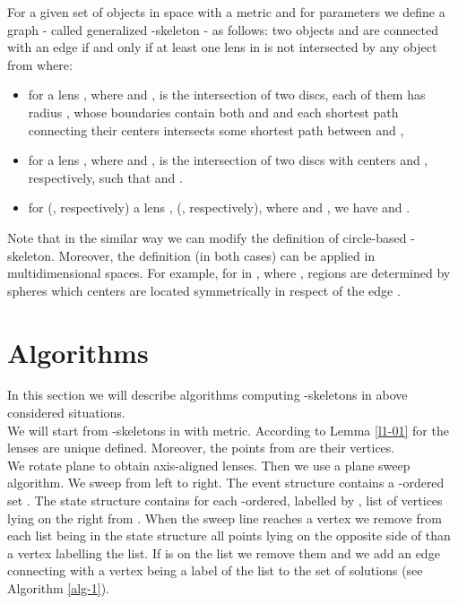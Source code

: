 \documentclass[11pt]{llncs}
\begin{document}
\begin{definition}
\label{betaskeletons5}
For a given set of objects  in space  with a metric  and for parameters 
 we define a graph  - called generalized -skeleton -
as follows: 
two objects  and  are connected with an edge if and only if  
at least one lens in  is not intersected by any object from 
 where:
\begin{itemize}
\item
for  a lens , where  
and , is the intersection of two discs, each of them has radius 
, whose boundaries contain both  and  and each shortest
path connecting their centers intersects some shortest path between  and , 

\item
for  a lens , where  
and , is the intersection of two discs with centers  and , respectively,
such that  and 
.

\item
for   (, respectively) a lens , 
(, respectively), where  
and , we have  
 and 
.
 
\end{itemize}
\end{definition}

Note that in the similar way we can modify the definition of circle-based -skeleton.
Moreover, the definition (in both cases) can be applied in multidimensional spaces.  
For example, for  in , where , regions  are 
determined by spheres which centers are located symmetrically in respect of the edge . 


\section{Algorithms}


In this section we will describe algorithms computing -skeletons in above considered
situations.\\

We will start from -skeletons in  with  metric. 
According to Lemma \ref{l1-01} for  the lenses are unique defined. Moreover, 
the points from  are their vertices. \\
We rotate plane to obtain axis-aligned lenses. Then we use a plane sweep algorithm.
We sweep from left to right. The event structure contains a -ordered set .
The state structure contains for each  -ordered, labelled by , list of vertices 
lying on the right from . When the sweep line reaches a vertex  we remove from each list being 
in the state structure all points lying on the opposite side of  than a vertex labelling the list. 
If  is on the list we remove them and we add an edge connecting  with a vertex being a label 
of the list to the set of solutions (see Algorithm \ref{alg-1}). \\ 
\end{document}
